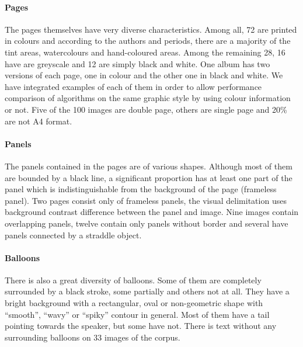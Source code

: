 
\paragraph{Pages} %
\label{par:pages}
The pages themselves have very diverse characteristics.
Among all, 72 are printed in colours and according to the authors and periods, there are a majority of the tint areas, watercolours and hand-coloured areas.
Among the remaining 28, 16 have are greyscale and 12 are simply black and white.
One album has two versions of each page, one in colour and the other one in black and white.
We have integrated examples of each of them in order to allow performance comparison of algorithms on the same graphic style by using colour information or not.
Five of the 100 images are double page, others are single page and 20\% are not A4 format.

\paragraph{Panels} %
\label{par:panels}
The panels contained in the pages are of various shapes.
Although most of them are bounded by a black line, a significant proportion has at least one part of the panel which is indistinguishable from the background of the page (frameless panel).
Two pages consist only of frameless panels, the visual delimitation uses background contrast difference between the panel and image.
Nine images contain overlapping panels, twelve contain only panels without border and several have panels connected by a straddle object.


\paragraph{Balloons} %
\label{par:balloons}
There is also a great diversity of balloons.
Some of them are completely surrounded by a black stroke, some partially and others not at all.
They have a bright background with a rectangular, oval or non-geometric shape with ``smooth'', ``wavy'' or ``spiky'' contour in general.
Most of them have a tail pointing towards the speaker, but some have not.
There is text without any surrounding balloons on 33 images of the corpus.

